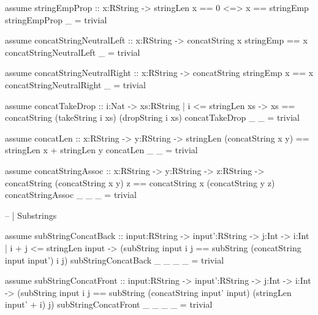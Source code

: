 \begin{code}
assume stringEmpProp :: x:RString  -> { stringLen x == 0 <=> x == stringEmp }
stringEmpProp _ = trivial 
 
assume concatStringNeutralLeft :: x:RString -> {concatString x stringEmp == x}
concatStringNeutralLeft _ = trivial

assume concatStringNeutralRight :: x:RString -> {concatString stringEmp x == x}
concatStringNeutralRight _ = trivial

assume concatTakeDrop :: i:Nat -> xs:{RString | i <= stringLen xs} 
    -> {xs == concatString (takeString i xs) (dropString i xs) }
concatTakeDrop _ _ = trivial

assume concatLen :: x:RString -> y:RString -> { stringLen (concatString x y) == stringLen x + stringLen y }
concatLen _ _ = trivial

assume concatStringAssoc :: x:RString -> y:RString -> z:RString 
     -> {concatString (concatString x y) z == concatString x (concatString y z) }
concatStringAssoc _ _ _ = trivial


-- | Substrings 

assume subStringConcatBack :: input:RString -> input':RString -> j:Int -> i:{Int | i + j <= stringLen input }
  -> { (subString input i j == subString (concatString input input') i j) }
subStringConcatBack _ _ _ _ = trivial  


assume subStringConcatFront  
  :: input:RString -> input':RString -> j:Int -> i:Int 
  -> { (subString input i j == subString (concatString input' input) (stringLen input' + i) j) }
subStringConcatFront _ _ _ _ = trivial
\end{code}